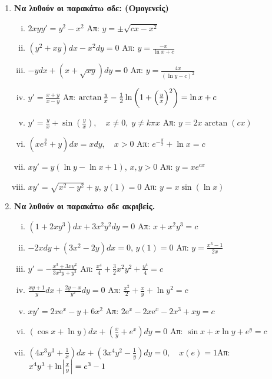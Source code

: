 \begin{enumerate}
  \item {\bfseries Να λυθούν οι παρακάτω σδε: (Ομογενείς)}
    \begin{enumerate}[i)]
      \item $ 2xy y' = y^{2} - x^{2} $ \hfill Απ: $ y = \pm \sqrt{cx-x^{2}} $ 
      \item $ \left(y^{2}+xy\right)dx - x^{2}dy =0 $ 
        \hfill Απ: $ y= \frac{-x}{\ln{x} + c} $ 
      \item $ -ydx+(x+ \sqrt{xy} )dy=0 $ \hfill Απ: $ y= \frac{4x}{(\ln{y} -c)^{2}} $  
      \item $ y'= \frac{x+y}{x-y} $ \hfill Απ: $ \arctan \frac{y}{x} - \frac{1}{2}
        \ln{\left(1 + \Bigl(\frac{y}{x}\Bigr)^{2}\right)} = \ln{x} + c  $  
      \item $y'=\frac{y}{x}+\sin(\frac{y}{x}), \quad x\neq 0,\; y\neq k\pi x$ 
        \hfill Απ: $y=2x\arctan(cx)$
      \item $\left(xe^{\frac{y}{x}}+y\right)dx=xdy, \quad x>0$ 
        \hfill Απ: $e^{-\frac{y}{x}}+\ln x =c$
      \item $ xy'=y(\ln{y} - \ln{x} +1) $, \quad $ x,y>0 $ \hfill Απ: $ y=xe^{cx} $ 
      \item $ xy' = \sqrt{ x^{2}-y^{2} } +y $, \quad $ y(1)=0 $ 
        \hfill Απ: $ y = x \sin{(\ln{x})}$  
    \end{enumerate}

  \item {\bfseries Να λυθούν οι παρακάτω σδε ακριβείς.}
    \begin{enumerate}[i)]
      \item $ (1+2xy^{3})dx + 3x^{2}y^{2}dy = 0 $ 
        \hfill Απ: $x+x^{2}y^{3}=c$ 
      \item $ -2xdy + (3x^{2}-2y)dx=0 $, \quad $ y(1)=0 $ 
        \hfill Απ: $ y= \frac{x^{3}-1}{2x} $ 
      \item $ y'=- \frac{x^{3}+3xy^{2}}{3x^{2}y+y^{3}} $ 
        \hfill Απ: $ \frac{x^{4}}{4} + \frac{3}{2} x^{2}y^{2} + \frac{y^{4}}{4} = c $ 
      \item $ \frac{xy+1}{y} dx + \frac{2y-x}{y^{2}} dy=0 $ 
        \hfill Απ: $ \frac{x^{2}}{2} + \frac{x}{y} + \ln{y^{2}} =c $ 
      \item $ x y' = 2x \mathrm{e}^{x} -y+6x^{2} $ 
        \hfill Απ: $ 2 \mathrm{e}^{x} - 2x \mathrm{e}^{x} - 2x^{3} + xy=c $ 
      \item $ (\cos{x} + \ln{y})dx + \left(\frac{x}{y} + e^{x}\right)dy=0 $ 
        \hfill Απ: $ \sin{x} + x \ln{y} + e^{y}=c $ 
      \item $\left(4x^3y^3+\frac{1}{x}\right)dx+\left(3x^4y^2-\frac{1}{y}\right)dy=0, 
        \quad x(e)=1$\hfill Απ: $x^4y^3+\ln \Bigl|\frac{x}{y}\Bigr|=e^3-1$
    \end{enumerate}


\end{enumerate}

